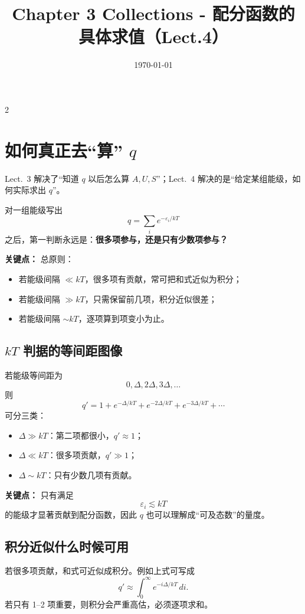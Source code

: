 \documentclass[a4paper,9pt]{article}
\title{\vspace{-2em}\Large\bfseries\color{sectioncolor} Chapter 3 Collections - 配分函数的具体求值（Lect.4）\vspace{-1em}}
\author{}
\date{\today}
\newenvironment{keypoint}
{\par\vspace{0.3em}\noindent\begin{tcolorbox}[
  colback=keybg,
  colframe=keycolor,
  boxrule=0.5pt,
  arc=2pt,
  left=2pt,
  right=2pt,
  top=2pt,
  bottom=2pt,
  boxsep=0pt,
  ]
\noindent\textcolor{keycolor}{\textbf{关键点：}}}
{\end{tcolorbox}\par\vspace{0.3em}}
\begin{document}
\maketitle
\thispagestyle{fancy}

\begin{multicols}{2}

\scriptsize{\tableofcontents}

	\section{如何真正去“算” $q$}

	Lect.~3 解决了“知道 $q$ 以后怎么算 $A,U,S$”；Lect.~4 解决的是“给定某组能级，如何实际求出 $q$”。

	对一组能级写出
	\[
		q=\sum_i e^{-\varepsilon_i/kT}
	\]
	之后，第一判断永远是：\textbf{很多项参与，还是只有少数项参与？}

	\begin{keypoint}
		总原则：
		\begin{itemize}
			\item 若能级间隔 $\ll kT$，很多项有贡献，常可把和式近似为积分；
			\item 若能级间隔 $\gg kT$，只需保留前几项，积分近似很差；
			\item 若能级间隔 $\sim kT$，逐项算到项变小为止。
		\end{itemize}
	\end{keypoint}

	\subsection{$kT$ 判据的等间距图像}
	若能级等间距为
	\[
		0,\Delta,2\Delta,3\Delta,\dots
	\]
	则
	\[
		q'=1+e^{-\Delta/kT}+e^{-2\Delta/kT}+e^{-3\Delta/kT}+\cdots
	\]
	可分三类：
	\begin{itemize}
		\item $\Delta\gg kT$：第二项都很小，$q'\approx1$；
		\item $\Delta\ll kT$：很多项贡献，$q'\gg1$；
		\item $\Delta\sim kT$：只有少数几项有贡献。
	\end{itemize}

	\begin{keypoint}
		只有满足
		\[
			\varepsilon_i\lesssim kT
		\]
		的能级才显著贡献到配分函数，因此 $q$ 也可以理解成“可及态数”的量度。
	\end{keypoint}

	\subsection{积分近似什么时候可用}
	若很多项贡献，和式可近似成积分。例如上式可写成
	\[
		q'\approx \int_0^{\infty} e^{-i\Delta/kT}\,di.
	\]
	若只有 1--2 项重要，则积分会严重高估，必须逐项求和。


\end{multicols}
\end{document}
